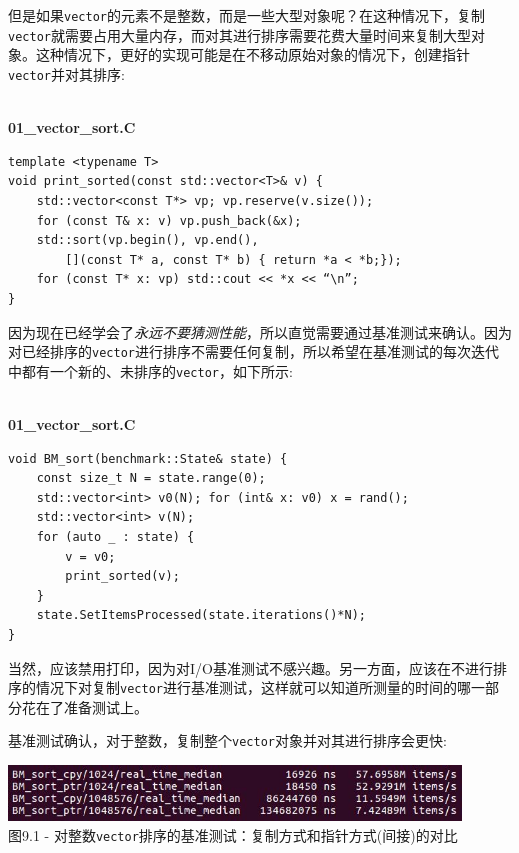 但是如果\texttt{vector}的元素不是整数，而是一些大型对象呢？在这种情况下，复制\texttt{vector}就需要占用大量内存，而对其进行排序需要花费大量时间来复制大型对象。这种情况下，更好的实现可能是在不移动原始对象的情况下，创建指针\texttt{vector}并对其排序:

\hspace*{\fill} \\ %
\noindent
\textbf{01\_vector\_sort.C}
\begin{lstlisting}[style=styleCXX]
template <typename T>
void print_sorted(const std::vector<T>& v) {
	std::vector<const T*> vp; vp.reserve(v.size());
	for (const T& x: v) vp.push_back(&x);
	std::sort(vp.begin(), vp.end(), 
		[](const T* a, const T* b) { return *a < *b;});
	for (const T* x: vp) std::cout << *x << “\n”;
}
\end{lstlisting}

因为现在已经学会了\textit{永远不要猜测性能}，所以直觉需要通过基准测试来确认。因为对已经排序的\texttt{vector}进行排序不需要任何复制，所以希望在基准测试的每次迭代中都有一个新的、未排序的\texttt{vector}，如下所示:

\hspace*{\fill} \\ %
\noindent
\textbf{01\_vector\_sort.C}
\begin{lstlisting}[style=styleCXX]
void BM_sort(benchmark::State& state) {
	const size_t N = state.range(0);
	std::vector<int> v0(N); for (int& x: v0) x = rand();
	std::vector<int> v(N);
	for (auto _ : state) {
		v = v0;
		print_sorted(v);
	}
	state.SetItemsProcessed(state.iterations()*N);
}
\end{lstlisting}

当然，应该禁用打印，因为对I/O基准测试不感兴趣。另一方面，应该在不进行排序的情况下对复制\texttt{vector}进行基准测试，这样就可以知道所测量的时间的哪一部分花在了准备测试上。

基准测试确认，对于整数，复制整个\texttt{vector}对象并对其进行排序会更快:

\begin{center}
\includegraphics[width=0.9\textwidth]{content/3/chapter9/images/1.jpg}\\
图9.1 - 对整数\texttt{vector}排序的基准测试：复制方式和指针方式(间接)的对比
\end{center}

